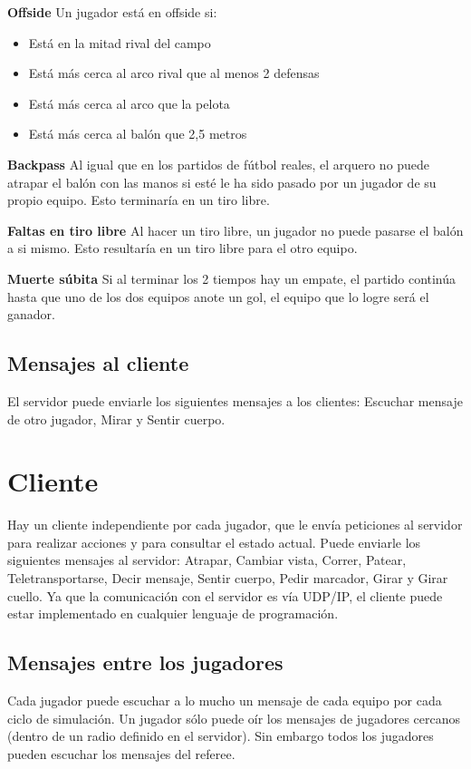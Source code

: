 \textbf{Offside}
Un jugador está en offside si:
\begin{itemize}
\item Está en la mitad rival del campo
\item Está más cerca al arco rival que al menos 2 defensas
\item Está más cerca al arco que la pelota
\item Está más cerca al balón que 2,5 metros
\end{itemize}

\textbf{Backpass}
Al igual que en los partidos de fútbol reales, el arquero no puede atrapar el balón con las manos si esté le ha sido pasado por un jugador de su propio equipo. Esto terminaría en un tiro libre.

\textbf{Faltas en tiro libre}
Al hacer un tiro libre, un jugador no puede pasarse el balón a si mismo. Esto resultaría en un tiro libre para el otro equipo.

\textbf{Muerte súbita}
Si al terminar los 2 tiempos hay un empate, el partido continúa hasta que uno de los dos equipos anote un gol, el equipo que lo logre será el ganador.


\subsection{Mensajes al cliente}

El servidor puede enviarle los siguientes mensajes a los clientes: Escuchar mensaje de otro jugador, Mirar y Sentir cuerpo.


\section{Cliente}

Hay un cliente independiente por cada jugador, que le envía peticiones al servidor para realizar acciones y para consultar el estado actual. Puede enviarle los siguientes mensajes al servidor: Atrapar, Cambiar vista, Correr, Patear, Teletransportarse, Decir mensaje, Sentir cuerpo, Pedir marcador, Girar y Girar cuello. Ya que la comunicación con el servidor es vía UDP/IP, el cliente puede estar implementado en cualquier lenguaje de programación.


\subsection{Mensajes entre los jugadores}

Cada jugador puede escuchar a lo mucho un mensaje de cada equipo por cada ciclo de simulación. Un jugador sólo puede oír los mensajes de jugadores cercanos (dentro de un radio definido en el servidor). Sin embargo todos los jugadores pueden escuchar los mensajes del referee.

